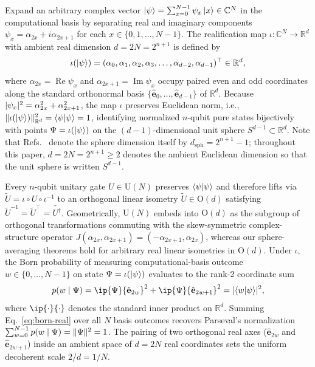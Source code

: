 Expand an arbitrary complex vector $\ket{\psi} = \sum_{x=0}^{N-1} \psi_x \ket{x} \in \mathbb{C}^N$ in the computational basis by separating real and imaginary components $\psi_x = \alpha_{2x} + i\alpha_{2x+1}$ for each $x \in \{0, 1, \dots, N - 1\}$. The realification map $\iota : \mathbb{C}^N \to \mathbb{R}^d$ with ambient real dimension $d = 2N = 2^{n+1}$ is defined by
\begin{equation}
\iota(\ket{\psi}) = (\alpha_0, \alpha_1, \alpha_2, \alpha_3, \dots, \alpha_{d-2}, \alpha_{d-1})^\top \in \mathbb{R}^d,
\label{eq:realification}
\end{equation}
where $\alpha_{2x} = \operatorname{Re}\psi_x$ and $\alpha_{2x+1} = \operatorname{Im}\psi_x$ occupy paired even and odd coordinates along the standard orthonormal basis $\{\hat{\mathbf{e}}_0, \dots, \hat{\mathbf{e}}_{d-1}\}$ of $\mathbb{R}^d$. Because $\lvert\psi_x\rvert^2 = \alpha_{2x}^2 + \alpha_{2x+1}^2$, the map $\iota$ preserves Euclidean norm, i.e., $\lVert\iota(\ket{\psi})\rVert_{\mathbb{R}^d}^2 = \braket{\psi | \psi} = 1$, identifying normalized $n$-qubit pure states bijectively with points $\Psi = \iota(\ket{\psi})$ on the $(d - 1)$-dimensional unit sphere $S^{d-1} \subset \mathbb{R}^d$. Note that Refs.~\cite{LacallePozoCoronado2019,SahaRoyLacalle2026} denote the sphere dimension itself by $d_{\mathrm{sph}} = 2^{n+1} - 1$; throughout this paper, $d = 2N = 2^{n+1} \ge 2$ denotes the ambient Euclidean dimension so that the unit sphere is written $S^{d-1}$.

Every $n$-qubit unitary gate $U \in \mathrm{U}(N)$ preserves $\braket{\psi | \psi}$ and therefore lifts via $\widetilde{U} = \iota \circ U \circ \iota^{-1}$ to an orthogonal linear isometry $\widetilde{U} \in \mathrm{O}(d)$ satisfying $\widetilde{U}^{-1} = \widetilde{U}^\top = \widetilde{U^\dagger}$. Geometrically, $\mathrm{U}(N)$ embeds into $\mathrm{O}(d)$ as the subgroup of orthogonal transformations commuting with the skew-symmetric complex-structure operator $J(\alpha_{2x}, \alpha_{2x+1}) = (-\alpha_{2x+1}, \alpha_{2x})$, whereas our sphere-averaging theorems hold for arbitrary real linear isometries in $\mathrm{O}(d)$. Under $\iota$, the Born probability of measuring computational-basis outcome $w \in \{0, \dots, N - 1\}$ on state $\Psi = \iota(\ket{\psi})$ evaluates to the rank-2 coordinate sum
\begin{equation}
p(w \mid \Psi) = \ip{\Psi}{\hat{\mathbf{e}}_{2w}}^2 + \ip{\Psi}{\hat{\mathbf{e}}_{2w+1}}^2 = \abs{\braket{w | \psi}}^2,
\label{eq:born-real}
\end{equation}
where $\ip{\cdot}{\cdot}$ denotes the standard inner product on $\mathbb{R}^d$. Summing Eq.~\eqref{eq:born-real} over all $N$ basis outcomes recovers Parseval's normalization $\sum_{w=0}^{N-1} p(w \mid \Psi) = \lVert\Psi\rVert^2 = 1$. The pairing of two orthogonal real axes ($\hat{\mathbf{e}}_{2w}$ and $\hat{\mathbf{e}}_{2w+1}$) inside an ambient space of $d = 2N$ real coordinates sets the uniform decoherent scale $2/d = 1/N$.

